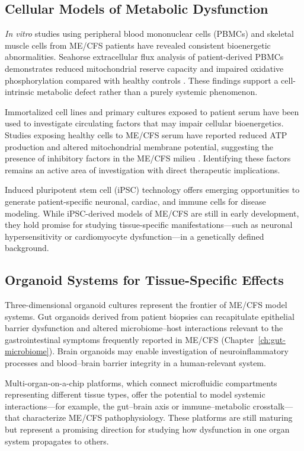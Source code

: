\subsection{Cellular Models of Metabolic Dysfunction}

\textit{In vitro} studies using peripheral blood mononuclear cells (PBMCs) and skeletal muscle cells from ME/CFS patients have revealed consistent bioenergetic abnormalities. Seahorse extracellular flux analysis of patient-derived PBMCs demonstrates reduced mitochondrial reserve capacity and impaired oxidative phosphorylation compared with healthy controls \cite{Tomas2017, Missailidis2020}. These findings support a cell-intrinsic metabolic defect rather than a purely systemic phenomenon.

Immortalized cell lines and primary cultures exposed to patient serum have been used to investigate circulating factors that may impair cellular bioenergetics. Studies exposing healthy cells to ME/CFS serum have reported reduced ATP production and altered mitochondrial membrane potential, suggesting the presence of inhibitory factors in the ME/CFS milieu \cite{Fluge2016}. Identifying these factors remains an active area of investigation with direct therapeutic implications.

Induced pluripotent stem cell (iPSC) technology offers emerging opportunities to generate patient-specific neuronal, cardiac, and immune cells for disease modeling. While iPSC-derived models of ME/CFS are still in early development, they hold promise for studying tissue-specific manifestations---such as neuronal hypersensitivity or cardiomyocyte dysfunction---in a genetically defined background.

\subsection{Organoid Systems for Tissue-Specific Effects}

Three-dimensional organoid cultures represent the frontier of ME/CFS model systems. Gut organoids derived from patient biopsies can recapitulate epithelial barrier dysfunction and altered microbiome--host interactions relevant to the gastrointestinal symptoms frequently reported in ME/CFS (Chapter~\ref{ch:gut-microbiome}). Brain organoids may enable investigation of neuroinflammatory processes and blood--brain barrier integrity in a human-relevant system.

Multi-organ-on-a-chip platforms, which connect microfluidic compartments representing different tissue types, offer the potential to model systemic interactions---for example, the gut--brain axis or immune--metabolic crosstalk---that characterize ME/CFS pathophysiology. These platforms are still maturing but represent a promising direction for studying how dysfunction in one organ system propagates to others.

